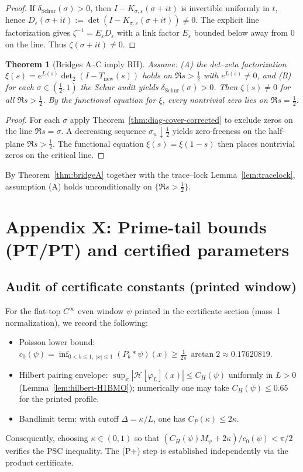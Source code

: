 \documentclass[11pt]{article}
\newtheorem{theorem}{Theorem}
\theoremstyle{definition}
\theoremstyle{remark}
\begin{document}
\begin{proof}
If $\delta_{\mathrm{Schur}}(\sigma)>0$, then $I-K_{\sigma,\varepsilon}(\sigma+it)$ is invertible uniformly in $t$, hence $D_\varepsilon(\sigma+it):=\det(I-K_{\sigma,\varepsilon}(\sigma+it))\neq 0$. The explicit line factorization gives $\zeta^{-1}=E_\varepsilon D_\varepsilon$ with a link factor $E_\varepsilon$ bounded below away from $0$ on the line. Thus $\zeta(\sigma+it)\neq 0$.
\end{proof}

\begin{theorem}[Bridges A--C imply RH]\label{thm:bridges-imply-RH}
Assume: (A) the det--zeta factorization $\xi(s)=e^{L(s)}\det_2(I-T_{\mathrm{new}}(s))$ holds on $\Re s>\tfrac12$ with $e^{L(s)}\neq 0$, and (B) for each $\sigma\in(\tfrac12,1)$ the Schur audit yields $\delta_{\mathrm{Schur}}(\sigma)>0$. Then $\zeta(s)\ne 0$ for all $\Re s>\tfrac12$. By the functional equation for $\xi$, every nontrivial zero lies on $\Re s=\tfrac12$.
\end{theorem}

\begin{proof}
For each $\sigma$ apply Theorem~\ref{thm:diag-cover-corrected} to exclude zeros on the line $\Re s=\sigma$. A decreasing sequence $\sigma_n\downarrow\tfrac12$ yields zero-freeness on the half-plane $\Re s>\tfrac12$. The functional equation $\xi(s)=\xi(1-s)$ then places nontrivial zeros on the critical line.
\end{proof}

By Theorem~\ref{thm:bridgeA} together with the trace--lock Lemma~\ref{lem:tracelock}, assumption (A) holds unconditionally on $\{\Re s>\tfrac12\}$.

\section*{Appendix X: Prime-tail bounds (PT/PT) and certified parameters}
\subsection*{Audit of certificate constants (printed window)}
For the flat-top $C^\infty$ even window $\psi$ printed in the certificate section (mass--1 normalization), we record the following:
\begin{itemize}
 \item Poisson lower bound: $\displaystyle c_0(\psi)=\inf_{0<b\le1,\ |x|\le1}(P_b*\psi)(x)\ge \tfrac{1}{2\pi}\,\arctan 2\approx 0.17620819$.
 \item Hilbert pairing envelope: $\displaystyle \sup_x|\mathcal H[\varphi_L](x)|\le C_H(\psi)$ uniformly in $L>0$ (Lemma~\ref{lem:hilbert-H1BMO}); numerically one may take $C_H(\psi)\le 0.65$ for the printed profile.
 \item Bandlimit term: with cutoff $\Delta=\kappa/L$, one has $C_P(\kappa)\le 2\kappa$.
\end{itemize}
Consequently, choosing $\kappa\in(0,1)$ so that $(C_H(\psi)M_\psi+2\kappa)/c_0(\psi)<\pi/2$ verifies the PSC inequality. The (P+) step is established independently via the product certificate.
\end{document}
